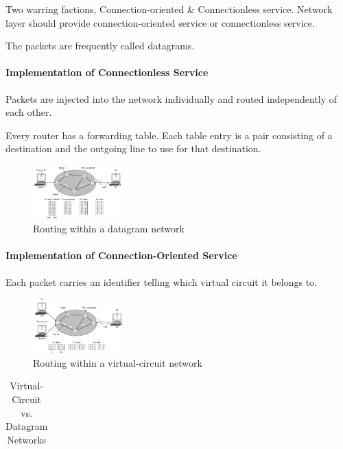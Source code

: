 Two warring factions, Connection-oriented \& Connectionless service. Network layer should provide connection-oriented service or connectionless service.

The packets are frequently called datagrams. 

\paragraph{Implementation of Connectionless Service}Packets are injected into the network individually and routed independently of each other. 

Every router has a forwarding table. Each table entry is a pair consisting of a destination and the outgoing line to use for that destination.

\begin{figure}[!htb]
    \centering
    \includegraphics[width=0.309\textwidth]{pic/CN5/Routing within a datagram network}
    \caption{Routing within a datagram network}
\end{figure}


\paragraph{Implementation of Connection-Oriented Service}Each packet carries an identifier telling which virtual circuit it belongs to.

\begin{figure}[!htb]
    \centering
    \includegraphics[width=0.309\textwidth]{pic/CN5/Routing within a virtual-circuit network}
    \caption{Routing within a virtual-circuit network}
\end{figure}


\begin{table}[!htb]%
    \centering
    \caption{Virtual-Circuit vs. Datagram Networks}
    \begin{tabular}[c]{ccc}\toprule
         \\ \midrule
        
        \bottomrule
    \end{tabular}
\end{table}



